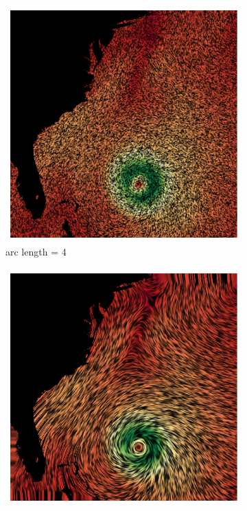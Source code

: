 \documentclass{article}
\begin{document}
\begin{figure}[h!]
    \centering
    \begin{subfigure}{0.32\textwidth}
        \centering
        \includegraphics[width=\textwidth]{steps_8000_kernel_length_4.png}
        \caption{arc length = 4}
    \end{subfigure}
    \hfill
    \begin{subfigure}{0.32\textwidth}
        \centering
        \includegraphics[width=\textwidth]{steps_8000_kernel_length_8.png}

\end{subfigure}
\end{figure}
\end{document}

